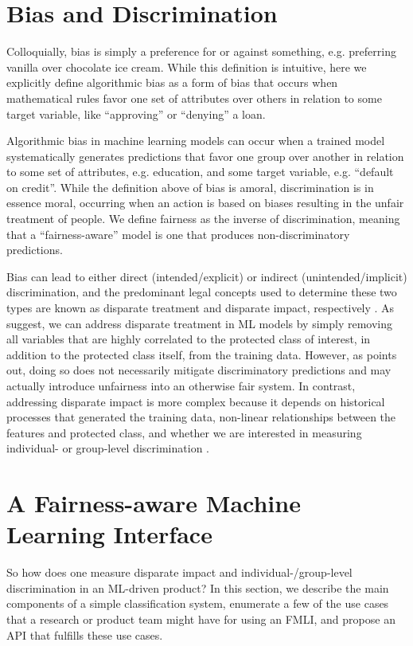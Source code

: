 \documentclass{{interact/interact}}
\begin{document}
\section{Bias and Discrimination}
Colloquially, bias is simply a preference for or against something, e.g.
preferring vanilla over chocolate ice cream. While this definition is
intuitive, here we explicitly define algorithmic bias as a form of bias that
occurs when mathematical rules favor one set of attributes over others in
relation to some target variable, like ``approving'' or ``denying'' a loan.

Algorithmic bias in machine learning models can occur when a trained model
systematically generates predictions that favor one group over another in
relation to some set of attributes, e.g. education, and some target variable,
e.g. ``default on credit''. While the definition above of bias is amoral,
discrimination is in essence moral, occurring when an action is based on biases
resulting in the unfair treatment of people. We define fairness as the inverse
of discrimination, meaning that a ``fairness-aware'' model is one that produces
non-discriminatory predictions.

Bias can lead to either direct (intended/explicit) or indirect
(unintended/implicit) discrimination, and the predominant legal concepts used to
determine these two types are known as disparate treatment and disparate impact,
respectively \cite{barocas2016big}. As \cite{kusner2017counterfactual,
kamiran2012data} suggest, we can address disparate treatment in ML models by
simply removing all variables that are highly correlated to the protected class
of interest, in addition to the protected class itself, from the training data.
However, as \cite{kusner2017counterfactual} points out, doing so does not
necessarily mitigate discriminatory predictions and may actually introduce
unfairness into an otherwise fair system. In contrast, addressing disparate
impact is more complex because it depends on historical processes that generated
the training data, non-linear relationships between the features and protected
class, and whether we are interested in measuring individual- or group-level
discrimination \cite{dwork2012fairness}.

\section{A Fairness-aware Machine Learning Interface}

So how does one measure
disparate impact and individual-/group-level discrimination in an ML-driven
product? In this section, we describe the main components of a simple
classification system, enumerate a few of the use cases that a research or
product team might have for using an FMLI, and propose an API that fulfills
these use cases.
\end{document}
